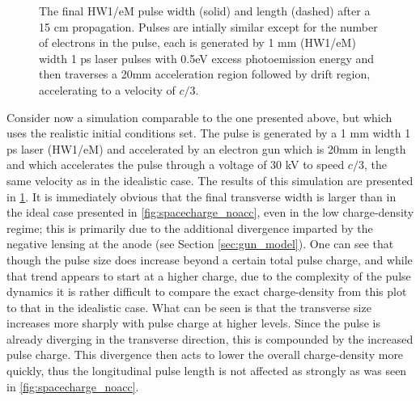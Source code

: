 \begin{figure}
  \centering
  \begin{tikzpicture}
    
  \end{tikzpicture}
  \caption[More realistic free-space pulse evolution vs charge density]{
    The final HW1/eM pulse width (solid) and length (dashed) after a 15 cm propagation. 
    Pulses are intially similar except for the number of electrons in the pulse, each is generated by 1 mm (HW1/eM) width 1 ps laser pulses with 0.5eV excess photoemission energy and then traverses a 20mm acceleration region followed by drift region, accelerating to a velocity of $c/3$.
  }
  \label{fig:spacecharge_acc}
\end{figure}

Consider now a simulation comparable to the one presented above, but which uses the realistic initial conditions set.
The pulse is generated by a 1 mm width 1 ps laser (HW1/eM) and accelerated by an electron gun which is 20mm in length and which accelerates the pulse through a voltage of 30 kV to speed $c/3$, the same velocity as in the idealistic case.
The results of this simulation are presented in \ref{fig:spacecharge_acc}.
It is immediately obvious that the final transverse width is larger than in the ideal case presented in \ref{fig:spacecharge_noacc}, even in the low charge-density regime; this is primarily due to the additional divergence imparted by the negative lensing at the anode (see Section \ref{sec:gun_model}).
One can see that though the pulse size does increase beyond a certain total pulse charge, and while that trend appears to start at a higher charge, due to the complexity of the pulse dynamics it is rather difficult to compare the exact charge-density from this plot to that in the idealistic case.
What can be seen is that the transverse size increases more sharply with pulse charge at higher levels.
Since the pulse is already diverging in the transverse direction, this is compounded by the increased pulse charge.
This divergence then acts to lower the overall charge-density more quickly, thus the longitudinal pulse length is not affected as strongly as was seen in \ref{fig:spacecharge_noacc}.


